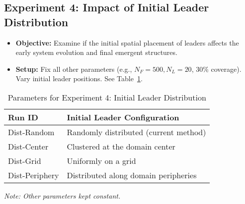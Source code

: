 \documentclass[11pt]{article}
\begin{document}
\subsection{Experiment 4: Impact of Initial Leader Distribution}
\begin{itemize}
    \item \textbf{Objective:} Examine if the initial spatial placement of leaders affects the early system evolution and final emergent structures.
    \item \textbf{Setup:} Fix all other parameters (e.g., $N_F=500, N_L=20$, 30\% coverage). Vary initial leader positions. See Table~\ref{tab:exp4_params}.
\end{itemize}
\begin{table}[H]
    \centering
    \caption{Parameters for Experiment 4: Initial Leader Distribution}
    \label{tab:exp4_params}
    \begin{tabular}{ll}
        \toprule
        Run ID & Initial Leader Configuration \\
        \midrule
        Dist-Random   & Randomly distributed (current method) \\
        Dist-Center   & Clustered at the domain center \\
        Dist-Grid     & Uniformly on a grid \\
        Dist-Periphery& Distributed along domain peripheries \\
        \bottomrule
    \end{tabular}
    \parbox{\textwidth}{\footnotesize \textit{Note: Other parameters kept constant.}}
\end{table}
\end{document}
